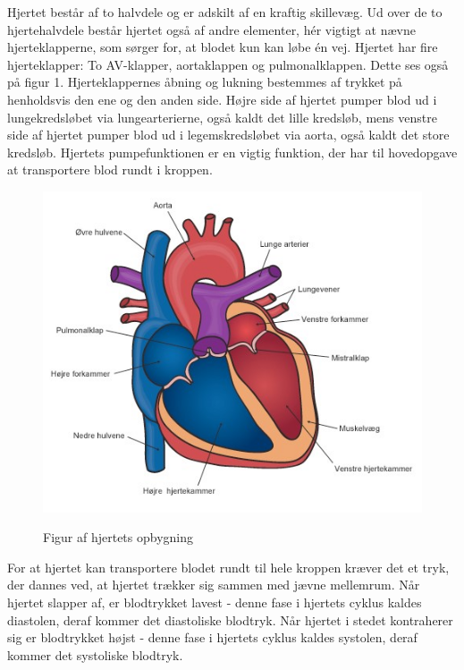 Hjertet består af to halvdele og er adskilt af en kraftig skillevæg. Ud over de to hjertehalvdele
består hjertet også af andre elementer, hér vigtigt at nævne hjerteklapperne, som sørger for,
at blodet kun kan løbe én vej. Hjertet har fire hjerteklapper: To AV-klapper, aortaklappen og
pulmonalklappen. Dette ses også på figur 1. Hjerteklappernes åbning og lukning bestemmes af trykket på henholdsvis den ene og den anden side. Højre side af hjertet pumper blod ud i lungekredsløbet via lungearterierne, også kaldt det lille kredsløb, mens venstre side af hjertet pumper blod ud i legemskredsløbet via aorta, også kaldt det store kredsløb. Hjertets pumpefunktionen er en vigtig funktion, der har til hovedopgave at transportere blod rundt i kroppen.

\begin{figure}[h!]
	\centering
	\includegraphics[width=0.5\linewidth]{Teori/Fysiologi/hjerte}
	\label{fig:hjerte}
	\caption{Figur af hjertets opbygning \cite{Hjerte}}
\end{figure}

For at hjertet kan transportere blodet rundt til hele kroppen kræver det et tryk, der dannes
ved, at hjertet trækker sig sammen med jævne mellemrum. Når hjertet slapper af, er blodtrykket
lavest - denne fase i hjertets cyklus kaldes diastolen, deraf kommer det diastoliske blodtryk. Når
hjertet i stedet kontraherer sig er blodtrykket højst - denne fase i hjertets cyklus kaldes systolen,
deraf kommer det systoliske blodtryk. 

